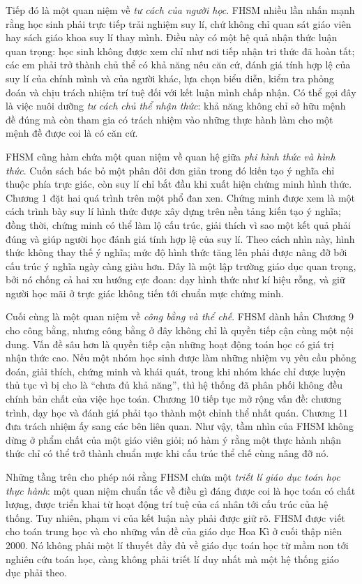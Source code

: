 Tiếp đó là một quan niệm về \emph{tư cách của người học}. FHSM nhiều lần nhấn
mạnh rằng học sinh phải trực tiếp trải nghiệm suy lí, chứ không chỉ quan sát
giáo viên hay sách giáo khoa suy lí thay mình. Điều này có một hệ quả nhận
thức luận quan trọng: học sinh không được xem chỉ như nơi tiếp nhận tri thức
đã hoàn tất; các em phải trở thành chủ thể có khả năng nêu căn cứ, đánh giá
tính hợp lệ của suy lí của chính mình và của người khác, lựa chọn biểu diễn,
kiểm tra phỏng đoán và chịu trách nhiệm trí tuệ đối với kết luận mình chấp
nhận. Có thể gọi đây là việc nuôi dưỡng \emph{tư cách chủ thể nhận thức}: khả
năng không chỉ sở hữu mệnh đề đúng mà còn tham gia có trách nhiệm vào những
thực hành làm cho một mệnh đề được coi là có căn cứ.

FHSM cũng hàm chứa một quan niệm về quan hệ giữa \emph{phi hình thức và hình
thức}. Cuốn sách bác bỏ một phân đôi đơn giản trong đó kiến tạo ý nghĩa chỉ
thuộc phía trực giác, còn suy lí chỉ bắt đầu khi xuất hiện chứng minh hình
thức. Chương 1 đặt hai quá trình trên một phổ đan xen. Chứng minh được xem là
một cách trình bày suy lí hình thức được xây dựng trên nền tảng kiến tạo ý
nghĩa; đồng thời, chứng minh có thể làm lộ cấu trúc, giải thích vì sao một kết
quả phải đúng và giúp người học đánh giá tính hợp lệ của suy lí. Theo cách
nhìn này, hình thức không thay thế ý nghĩa; mức độ hình thức tăng lên phải
được nâng đỡ bởi cấu trúc ý nghĩa ngày càng giàu hơn. Đây là một lập trường
giáo dục quan trọng, bởi nó chống cả hai xu hướng cực đoan: dạy hình thức như
kí hiệu rỗng, và giữ người học mãi ở trực giác không tiến tới chuẩn mực chứng
minh.

Cuối cùng là một quan niệm về \emph{công bằng và thể chế}. FHSM dành hẳn
Chương 9 cho công bằng, nhưng công bằng ở đây không chỉ là quyền tiếp cận cùng
một nội dung. Vấn đề sâu hơn là quyền tiếp cận những hoạt động toán học có giá
trị nhận thức cao. Nếu một nhóm học sinh được làm những nhiệm vụ yêu cầu
phỏng đoán, giải thích, chứng minh và khái quát, trong khi nhóm khác chỉ được
luyện thủ tục vì bị cho là ``chưa đủ khả năng'', thì hệ thống đã phân phối
không đều chính bản chất của việc học toán. Chương 10 tiếp tục mở rộng vấn đề:
chương trình, dạy học và đánh giá phải tạo thành một chỉnh thể nhất quán.
Chương 11 đưa trách nhiệm ấy sang các bên liên quan. Như vậy, tầm nhìn của
FHSM không dừng ở phẩm chất của một giáo viên giỏi; nó hàm ý rằng một thực
hành nhận thức chỉ có thể trở thành chuẩn mực khi cấu trúc thể chế cùng nâng
đỡ nó.

Những tầng trên cho phép nói rằng FHSM chứa một \emph{triết lí giáo dục toán
học thực hành}: một quan niệm chuẩn tắc về điều gì đáng được coi là học toán
có chất lượng, được triển khai từ hoạt động trí tuệ của cá nhân tới cấu trúc
của hệ thống. Tuy nhiên, phạm vi của kết luận này phải được giữ rõ. FHSM được
viết cho toán trung học và cho những vấn đề của giáo dục Hoa Kì ở cuối thập
niên 2000. Nó không phải một lí thuyết đầy đủ về giáo dục toán học từ mầm non
tới nghiên cứu toán học, càng không phải triết lí duy nhất mà một hệ thống
giáo dục phải theo.

